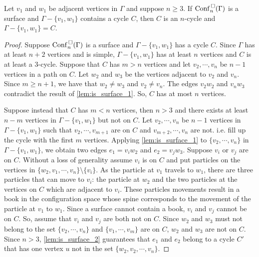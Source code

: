 \begin{lem}
\label{lem:is_surface_C}
Let \(v_1\) and \(w_1\) be adjacent vertices in \(\Gamma\) and suppose \(n \ge 3\).
If \(\mathrm{Conf}^{\,\square}_n(\Gamma)\) is a surface and \(\Gamma - \{v_1, w_1\}\) contains a cycle \(C\),
then \(C\) is an \(n\)-cycle and \(\Gamma - \{v_1, w_1\} = C\). 
\end{lem}
\begin{proof}
Suppose \(\mathrm{Conf}^{\,\square}_n(\Gamma)\) is a surface and \(\Gamma - \{v_1, w_1\}\) has a cycle \(C\).
Since \(\Gamma\) has at least \(n + 2\) vertices and is simple, 
\(\Gamma - \{v_1, w_1\}\) has at least \(n\) vertices and \(C\) is at least a \(3\)-cycle.
Suppose that \(C\) has \(m > n\) vertices and let \(v_2, \cdots, v_n\) be \(n-1\) vertices in a path on \(C\).
Let \(w_2\) and \(w_3\) be the vertices adjacent to \(v_2\) and \(v_n\).
Since \(m \ge n + 1\), we have that \(w_2 \neq w_3\) and \(v_2 \neq v_n\).
The edges \(v_2 w_2\) and \(v_n w_3\) contradict the result of \ref{lem:is_surface_1}.
So, \(C\) has at most \(n\) vertices.

Suppose instead that \(C\) has \(m < n\) vertices, then \(n > 3\) and there exists at least \(n - m\) vertices in \(\Gamma - \{v_1, w_1\}\) but not on \(C\).
Let \(v_2, \cdots, v_n\) be \(n - 1\) vertices in \(\Gamma - \{v_1, w_1\}\) such that \(v_2, \cdots, v_{m + 1}\) are on \(C\) and
\(v_{m + 2}, \cdots, v_n\) are not. i.e. fill up the cycle with the first \(m\) vertices.
Applying \ref{lem:is_surface_1} to \(\{v_2, \cdots, v_n\}\) in \(\Gamma - \{v_1, w_1\}\), we obtain two edges \(e_1 = v_i w_2\) and \(e_2 = v_j w_3\).
Suppose \(v_i\) or \(v_j\) are on \(C\). Without a loss of generality assume \(v_i\) is on \(C\) and
put particles on the vertices in \(\{w_2, v_1, \cdots, v_n\}\setminus\{v_i\}\).
As the particle at \(v_1\) travels to \(w_1\), there are three particles that can move to \(v_i\): the particle at \(w_2\) and the two
particles at the vertices on \(C\) which are adjacent to \(v_i\).
These particles movements result in a book in the configuration space whose spine corresponds to the movement of the particle at \(v_1\) to \(w_1\).
Since a surface cannot contain a book, \(v_i\) and \(v_j\) cannot be on \(C\).
So, assume that \(v_i\) and \(v_j\) are both not on \(C\).
Since \(w_2\) and \(w_3\) must not belong to the set \(\{v_2, \cdots, v_n\}\) and \(\{v_1, \cdots, v_m\}\) are on \(C\),
\(w_2\) and \(w_3\) are not on \(C\).
Since \(n > 3\), \ref{lem:is_surface_2} guarantees that \(e_1\) and \(e_2\) belong to a cycle \(C'\) that has one vertex \(u\) not in
the set \(\{w_2, v_2, \cdots, v_n\}\).


\end{proof}
